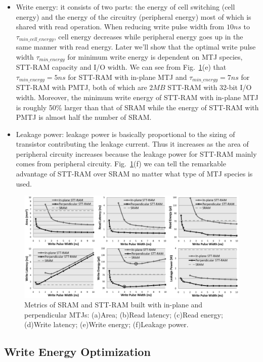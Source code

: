 \begin{itemize}
\item Write energy: it consists of two parts: the energy of cell switching (cell energy) and the energy of the circuitry (peripheral energy) most of which is shared with read operation. When reducing write pulse width from $10ns$ to $\tau_{min\_cell\_energy}$, cell energy decreases while peripheral energy goes up in the same manner with read energy. Later we'll show that the optimal write pulse width $\tau_{min\_energy}$ for minimum write energy is dependent on MTJ species, STT-RAM capacity and I/O width. We can see from Fig.~\ref{fig:metrics}(e) that $\tau_{min\_energy} = 5ns$ for STT-RAM with in-plane MTJ and $\tau_{min\_energy}= 7ns$ for STT-RAM with PMTJ, both of which are $2MB$ STT-RAM with 32-bit I/O width. Moreover, the minimum write energy of STT-RAM with in-plane MTJ is roughly 50\% larger than that of SRAM while the energy of STT-RAM with PMTJ is almost half the number of SRAM.
\item Leakage power: leakage power is basically proportional to the sizing of transistor contributing the leakage current. Thus it increases as the area of peripheral circuity increases because the leakage power for STT-RAM mainly comes from peripheral circuity. Fig.~\ref{fig:metrics}(f) we can tell the remarkable advantage of STT-RAM over SRAM no matter what type of MTJ species is used.
\end{itemize}


\begin{figure}[t]
  \centering
  \includegraphics[width=7in]{fig/AllMetrics.eps}
  \caption{Metrics of SRAM and STT-RAM built with in-plane and perpendicular MTJs: (a)Area; (b)Read latency; (c)Read energy; (d)Write latency; (e)Write energy; (f)Leakage power.}
  \label{fig:metrics}
\end{figure}

\subsection{Write Energy Optimization}

